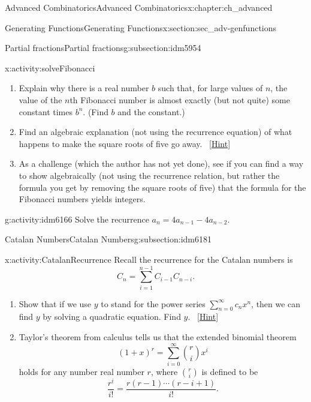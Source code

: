 \documentclass[oneside,10pt,]{book}
\numberwithin{equation}{chapter}
\begin{document}
\begin{chapterptx}{Advanced Combinatorics}{}{Advanced Combinatorics}{}{}{x:chapter:ch_advanced}
\begin{sectionptx}{Generating Functions}{}{Generating Functions}{}{}{x:section:sec_adv-genfunctions}
\begin{subsectionptx}{Partial fractions}{}{Partial fractions}{}{}{g:subsection:idm5954}
\begin{activity}{}{x:activity:solveFibonacci}
\begin{enumerate}[font=\bfseries,label=(\alph*),ref=\alph*]
\item{}Explain why there is a real number \(b\) such that, for large values of \(n\), the value of the \(n\)th Fibonacci number is almost exactly (but not quite) some constant times \(b^n\). (Find \(b\) and the constant.)%
\item{}Find an algebraic explanation (not using the recurrence equation) of what happens to make the square roots of five go away.%
\qquad~\hfill{\tiny\hyperlink{g:hint:idm6148-back}{[Hint]}}\item{}As a challenge (which the author has not yet done), see if you can find a way to show algebraically (not using the recurrence relation, but rather the formula you get by removing the square roots of five) that the formula for the Fibonacci numbers yields integers.%
\end{enumerate}
\end{activity}
\begin{activity}{}{g:activity:idm6166}%
Solve the recurrence \(a_n= 4a_{n-1} - 4a_{n-2}\).%
\end{activity}
\end{subsectionptx}
%
%
\typeout{************************************************}
\typeout{************************************************}
%
\begin{subsectionptx}{Catalan Numbers}{}{Catalan Numbers}{}{}{g:subsection:idm6181}
\begin{activity}{}{x:activity:CatalanRecurrence}%
Recall the recurrence for the Catalan numbers is%
\begin{equation*}
C_n = \sum_{i=1}^{n-1} C_{i-1}C_{n-i}\text{.}
\end{equation*}
%
\begin{enumerate}[font=\bfseries,label=(\alph*),ref=\alph*]
\item{}Show that if we use \(y\) to stand for the power series \(\sum_{n=0}^\infty c_nx^n\), then we can find \(y\) by solving a quadratic equation. Find \(y\).%
\qquad~\hfill{\tiny\hyperlink{g:hint:idm6194-back}{[Hint]}}\item{}Taylor's theorem from calculus tells us that the extended binomial theorem%
\begin{equation*}
(1+x)^r = \sum_{i=0}^\infty \binom{r}{i}x^i
\end{equation*}
holds for any number real number \(r\), where \(\binom{r}{i}\) is defined to be%
\begin{equation*}
\frac{r^{\underline{i}}}{i!} = \frac{r(r-1)\cdots(r-i+1)}{i!}\text{.}

\end{equation*}
\end{enumerate}
\end{activity}
\end{subsectionptx}
\end{sectionptx}
\end{chapterptx}
\end{document}
